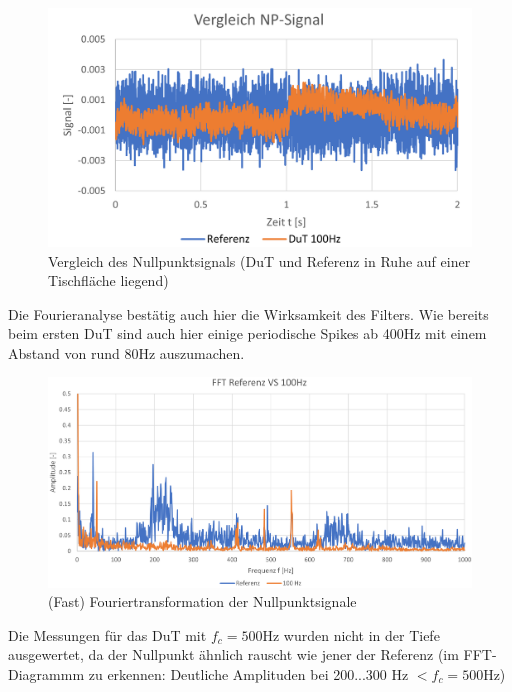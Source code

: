	\begin{figure}[H]
		\centering
		\includegraphics[width=1\linewidth]{Np_comp_100Hz}
		\caption{Vergleich des Nullpunktsignals (DuT und Referenz in Ruhe auf einer Tischfläche liegend)}
		\label{fig:npcomp100hz}
	\end{figure}
\noindent Die Fourieranalyse bestätig auch hier die Wirksamkeit des Filters. Wie bereits beim ersten DuT sind auch hier einige periodische Spikes ab 400Hz mit einem Abstand von rund 80Hz auszumachen.
	\begin{figure}[H]
		\centering
		\includegraphics[width=1\linewidth]{FFT100Hz}
		\caption{(Fast) Fouriertransformation der Nullpunktsignale}
		\label{fig:fft100hz}
	\end{figure}	
\noindent Die Messungen für das DuT mit  $f_c=500$Hz wurden nicht in der Tiefe ausgewertet, da der Nullpunkt ähnlich rauscht wie jener der Referenz (im FFT-Diagrammm zu erkennen: Deutliche Amplituden bei 200...300 Hz  $< f_c =500$Hz)
	